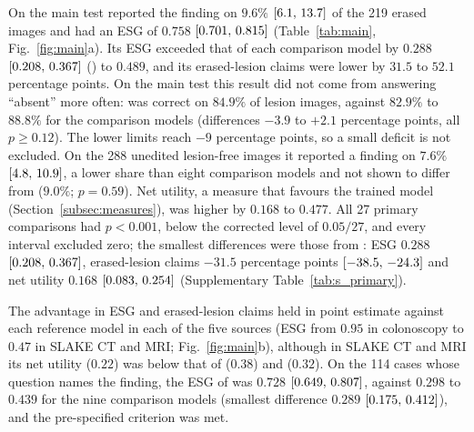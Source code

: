 On the main test \ms{} reported the finding on $9.6\%$ $[6.1,\,13.7]$ of the 219 erased images and had an ESG of $0.758$ $[0.701,\,0.815]$ (Table~\ref{tab:main}, Fig.~\ref{fig:main}a).
Its ESG exceeded that of each comparison model by $0.288$ $[0.208,\,0.367]$ (\gem) to $0.489$, and its erased-lesion claims were lower by $31.5$ to $52.1$ percentage points.
On the main test this result did not come from answering ``absent'' more often: \ms{} was correct on $84.9\%$ of lesion images, against $82.9\%$ to $88.8\%$ for the comparison models (differences $-3.9$ to $+2.1$ percentage points, all $p \ge 0.12$).
The lower limits reach $-9$ percentage points, so a small deficit is not excluded.
On the 288 unedited lesion-free images it reported a finding on $7.6\%$ $[4.8,\,10.9]$, a lower share than eight comparison models and not shown to differ from \gem{} ($9.0\%$; $p = 0.59$).
Net utility, a measure that favours the trained model (Section~\ref{subsec:measures}), was higher by $0.168$ to $0.477$.
All 27 primary comparisons had $p < 0.001$, below the corrected level of $0.05/27$, and every interval excluded zero; the smallest differences were those from \gem: ESG $0.288$ $[0.208,\,0.367]$, erased-lesion claims $-31.5$ percentage points $[-38.5,\,-24.3]$ and net utility $0.168$ $[0.083,\,0.254]$ (Supplementary Table~\ref{tab:s_primary}).

The advantage in ESG and erased-lesion claims held in point estimate against each reference model in each of the five sources (ESG from $0.95$ in colonoscopy to $0.47$ in SLAKE CT and MRI; Fig.~\ref{fig:main}b), although in SLAKE CT and MRI its net utility ($0.22$) was below that of \gem{} ($0.38$) and \opus{} ($0.32$).
On the 114 cases whose question names the finding, the ESG of \ms{} was $0.728$ $[0.649,\,0.807]$, against $0.298$ to $0.439$ for the nine comparison models (smallest difference $0.289$ $[0.175,\,0.412]$), and the pre-specified criterion was met.

